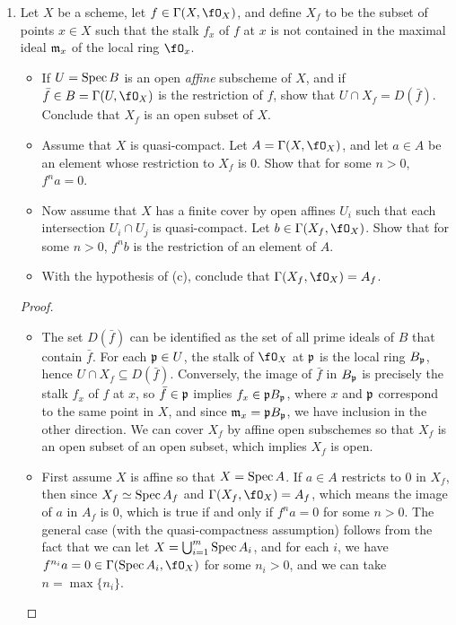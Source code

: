 \documentclass[a4paper]{article}
\begin{document}
\begin{enumerate} [label=\textbf{\arabic*.}, leftmargin=0em]
\item[\textbf{16.}] Let $X$ be a scheme, let $f \in \Gamma(X, \fO_X)$, and define $X_f$ to be the subset of points $x \in X$ such that the stalk $f_x$ of $f$ at $x$ is not contained in the maximal ideal $\mathfrak{m}_x$ of the local ring $\fO_x$.
\begin{itemize}
    \item[(a)] If $U = \operatorname{Spec}{B}$ is an open \textit{affine} subscheme of $X$, and if $\bar{f} \in B = \Gamma(U, \fO_X)$ is the restriction of $f$, show that $U \cap X_f = D(\bar{f})$. Conclude that $X_f$ is an open subset of $X$.
    \item[(b)] Assume that $X$ is quasi-compact. Let $A = \Gamma(X, \fO_X)$, and let $a \in A$ be an element whose restriction to $X_f$ is $0$. Show that for some $n > 0$, $f^n a = 0$.
    \item[(c)] Now assume that $X$ has a finite cover by open affines $U_i$ such that each intersection $U_i \cap U_j$ is quasi-compact. Let $b \in \Gamma(X_f, \fO_X)$. Show that for some $n > 0$, $f^n b$ is the restriction of an element of $A$.
    \item[(d)] With the hypothesis of (c), conclude that $\Gamma(X_f, \fO_{X}) = A_f$.
\end{itemize}

\begin{proof} $ $ \vspace{0pt}
    \begin{itemize} [leftmargin=0cm]
        \item[(a)] The set $D(\bar{f})$ can be identified as the set of all prime ideals of $B$ that contain $\bar{f}$. For each $\mathfrak{p} \in U$, the stalk of $\fO_X$ at $\mathfrak{p}$ is the local ring $B_{\mathfrak{p}}$, hence $U \cap X_f \subseteq D(\bar{f})$. Conversely, the image of $\bar{f}$ in $B_{\mathfrak{p}}$ is precisely the stalk $f_x$ of $f$ at $x$, so $\bar{f} \in \mathfrak{p}$ implies $f_x \in \mathfrak{p}B_{\mathfrak{p}}$, where $x$ and $\mathfrak{p}$ correspond to the same point in $X$, and since $\mathfrak{m}_x = \mathfrak{p} B_{\mathfrak{p}}$, we have inclusion in the other direction. We can cover $X_f$ by affine open subschemes so that $X_f$ is an open subset of an open subset, which implies $X_f$ is open.

        \item[(b)] First assume $X$ is affine so that $X = \operatorname{Spec}{A}$. If $a \in A$ restricts to $0$ in $X_f$, then since $X_f \simeq \operatorname{Spec}{A_f}$ and $\Gamma(X_f, \fO_X) = A_f$, which means the image of $a$ in $A_f$ is $0$, which is true if and only if $f^n a = 0$ for some $n > 0$. The general case (with the quasi-compactness assumption) follows from the fact that we can let $X = \bigcup_{i = 1}^m \operatorname{Spec}{A_i}$, and for each $i$, we have $f^{n_i} a = 0 \in \Gamma(\spec{A_i}, \fO_X)$ for some $n_i > 0$, and we can take $n = \max\{ n_i \}$.


\end{itemize}
\end{proof}
\end{enumerate}
\end{document}
